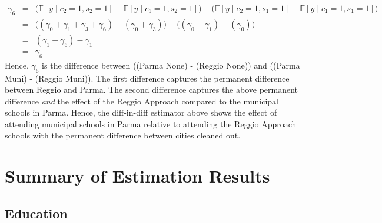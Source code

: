 \documentclass[11pt]{article}
\begin{document}
\begin{eqnarray*}
\gamma_6 & = & \Big(\mathbb{E}[y \mid c_2 = 1, s_2 = 1] - \mathbb{E}[y \mid c_1 = 1, s_2 = 1] \Big) - \Big(\mathbb{E}[y \mid c_2 = 1, s_1 = 1] - \mathbb{E}[y \mid c_1 = 1, s_1 = 1] \Big) \\
& = & \Big((\gamma_0 + \gamma_1 + \gamma_3 + \gamma_6) - (\gamma_0 + \gamma_3)\Big) - \Big((\gamma_0 + \gamma_1) - (\gamma_0) \Big) \\
& = & (\gamma_1 + \gamma_6) - \gamma_1 \\
& = & \gamma_6
\end{eqnarray*}
Hence, $\gamma_6$ is the difference between \Big((Parma None) - (Reggio None)\Big) and \Big((Parma Muni) - (Reggio Muni)\Big). The first difference captures the permanent difference between Reggio and Parma. The second difference captures the above permanent difference \textit{and} the effect of the Reggio Approach compared to the municipal schools in Parma. Hence, the diff-in-diff estimator above shows the effect of attending municipal schools in Parma relative to attending the Reggio Approach schools with the permanent difference between cities cleaned out.

\section{Summary of Estimation Results}
\subsection{Education}
\end{document}
